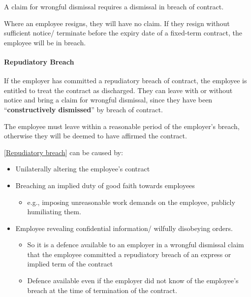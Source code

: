 \documentclass[
]{article}
\providecommand{\tightlist}{%
  \setlength{\itemsep}{0pt}\setlength{\parskip}{0pt}}
\begin{document}
A claim for wrongful dismissal requires a dismissal in breach of
contract.

Where an employee resigns, they will have no claim. If they resign
without sufficient notice/ terminate before the expiry date of a
fixed-term contract, the employee will be in breach.

\hypertarget{repudiatory-breach}{%
\paragraph{Repudiatory Breach}\label{repudiatory-breach}}

If the employer has committed a repudiatory breach of contract, the
employee is entitled to treat the contract as discharged. They can leave
with or without notice and bring a claim for wrongful dismissal, since
they have been ``\textbf{constructively dismissed}'' by breach of
contract.

The employee must leave within a reasonable period of the employer's
breach, otherwise they will be deemed to have affirmed the contract.

{[}\protect\hyperlink{repudiatory-breach}{Repudiatory breach}{]} can be
caused by:

\begin{itemize}
\tightlist
\item
  Unilaterally altering the employee's contract
\item
  Breaching an implied duty of good faith towards employees

  \begin{itemize}
  \tightlist
  \item
    e.g., imposing unreasonable work demands on the employee, publicly
    humiliating them.
  \end{itemize}
\item
  Employee revealing confidential information/ wilfully disobeying
  orders.

  \begin{itemize}
  \tightlist
  \item
    So it is a defence available to an employer in a wrongful dismissal
    claim that the employee committed a repudiatory breach of an express
    or implied term of the contract
  \item
    Defence available even if the employer did not know of the
    employee's breach at the time of termination of the contract.
  \end{itemize}
\end{itemize}
\end{document}
